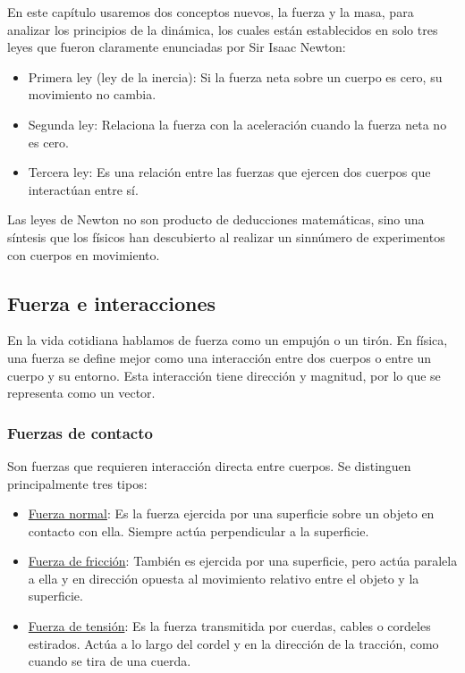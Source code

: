 \documentclass{article}
\newcommand{\newsubsection}[1]{
    \vspace{0.5cm}
    \color{sectionColor}
    \subsection{ #1}
    \color{black}
    \vspace{0.5cm}
}
\newcommand{\newtitle}[1]{
    \color{titleColor}
    \subsubsection{\textbf{#1}}
    \color{black}
}
\begin{document}
\par En este capítulo usaremos dos conceptos nuevos, la fuerza y la masa, para analizar los principios de la dinámica, los cuales están establecidos en solo tres leyes que fueron claramente enunciadas por Sir Isaac Newton:

\begin{itemize}
    \item Primera ley (ley de la inercia): Si la fuerza neta sobre un cuerpo es cero, su movimiento no cambia.
    \item Segunda ley: Relaciona la fuerza con la aceleración cuando la fuerza neta no es cero.
    \item Tercera ley: Es una relación entre las fuerzas que ejercen dos cuerpos que interactúan entre sí.
\end{itemize}

\par Las leyes de Newton no son producto de deducciones matemáticas, sino una síntesis que los físicos han descubierto al realizar un sinnúmero de experimentos con cuerpos en movimiento.


    \newsubsection{Fuerza e interacciones}

        \par En la vida cotidiana hablamos de fuerza como un empujón o un tirón. En física, una fuerza se define mejor como una interacción entre dos cuerpos o entre un cuerpo y su entorno. Esta interacción tiene dirección y magnitud, por lo que se representa como un vector.

    \newtitle{Fuerzas de contacto}

        \par Son fuerzas que requieren interacción directa entre cuerpos. Se distinguen principalmente tres tipos:

        \begin{itemize}
            \item \underline{Fuerza normal}: Es la fuerza ejercida por una superficie sobre un objeto en contacto con ella. Siempre actúa perpendicular a la superficie.
            \item \underline{Fuerza de fricción}: También es ejercida por una superficie, pero actúa paralela a ella y en dirección opuesta al movimiento relativo entre el objeto y la superficie.
            \item \underline{Fuerza de tensión}: Es la fuerza transmitida por cuerdas, cables o cordeles estirados. Actúa a lo largo del cordel y en la dirección de la tracción, como cuando se tira de una cuerda.
        \end{itemize}
\end{document}

